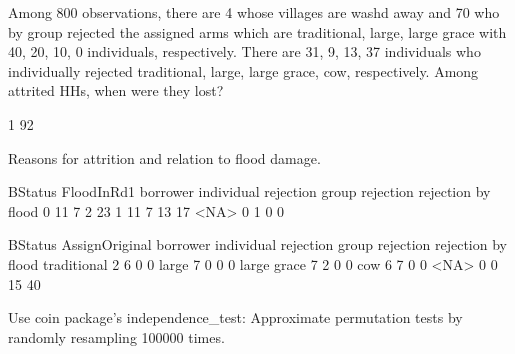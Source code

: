 Among 800 observations, there are 4 whose villages are washd away and 70 who by group rejected the assigned arms which are traditional, large, large grace with 40, 20, 10, 0 individuals, respectively. There are 31, 9, 13, 37 individuals who individually rejected traditional, large, large grace, cow, respectively. Among attrited HHs, when were they lost?
\begin{Schunk}
\begin{Soutput}

 1 
92 
\end{Soutput}
\end{Schunk}
Reasons for attrition and relation to flood damage.
\begin{Schunk}
\begin{Soutput}
          BStatus
FloodInRd1 borrower individual rejection group rejection rejection by flood
      0          11                    7               2                 23
      1          11                    7              13                 17
      <NA>        0                    1               0                  0
\end{Soutput}
\begin{Soutput}
              BStatus
AssignOriginal borrower individual rejection group rejection rejection by flood
   traditional        2                    6               0                  0
   large              7                    0               0                  0
   large grace        7                    2               0                  0
   cow                6                    7               0                  0
   <NA>               0                    0              15                 40
\end{Soutput}
\end{Schunk}
Use \textsf{coin} package's \textsf{independence\_test}: Approximate permutation tests by randomly resampling 100000 times.





